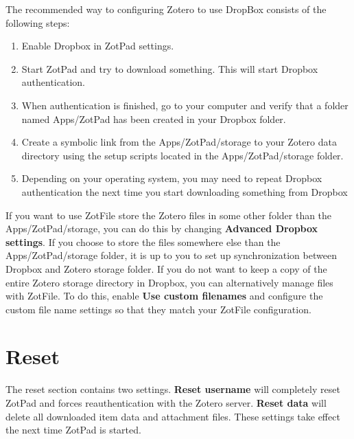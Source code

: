 \documentclass[oneside, openany, 12pt]{tufte-book}
\newcommand{\ipadfootnote}[1]{}
\newcommand{\ipadfootnote}[1]{\footnote{#1}}
\begin{document}
The recommended way to configuring Zotero to use DropBox consists of the following steps:

\begin{enumerate}
\item Enable Dropbox in ZotPad settings.
\item Start ZotPad and try to download something. This will start Dropbox authentication.
\item When authentication is finished, go to your computer and verify that a folder named Apps/ZotPad has been created in your Dropbox folder.
\item Create a symbolic link from the Apps/ZotPad/storage to your Zotero data directory using the setup scripts located in the Apps/ZotPad/storage folder.
\item Depending on your operating system, you may need to repeat Dropbox authentication the next time you start downloading something from Dropbox
\end{enumerate}

If you want to use ZotFile store the Zotero files in some other folder than the Apps/ZotPad/storage, you can do this by changing \textbf{Advanced Dropbox settings}. If you choose to store the files somewhere else than the Apps/ZotPad/storage folder, it is up to you to set up synchronization between Dropbox and Zotero storage folder\ipadfootnote{Although it is possible to put the entire Zotero data directory inside Dropbox, this is not recommended. Doing so will cause your database and its journal file to be synchronized to Dropbox cloud. This will create a large amount of unnecessary network traffic. Additionally, if you use Zotero on two different computers with this setup, there is a high risk of corrupting your Zotero database.}. If you do not want to keep a copy of the entire Zotero storage directory in Dropbox, you can alternatively manage files with ZotFile. To do this, enable \textbf{Use custom filenames} and configure the custom file name settings so that they match your ZotFile configuration.

\section{Reset}

The reset section contains two settings. \textbf{Reset username} will completely reset ZotPad and forces reauthentication with the Zotero server. \textbf{Reset data} will delete all downloaded item data and attachment files. These settings take effect the next time ZotPad is started.
\end{document}
